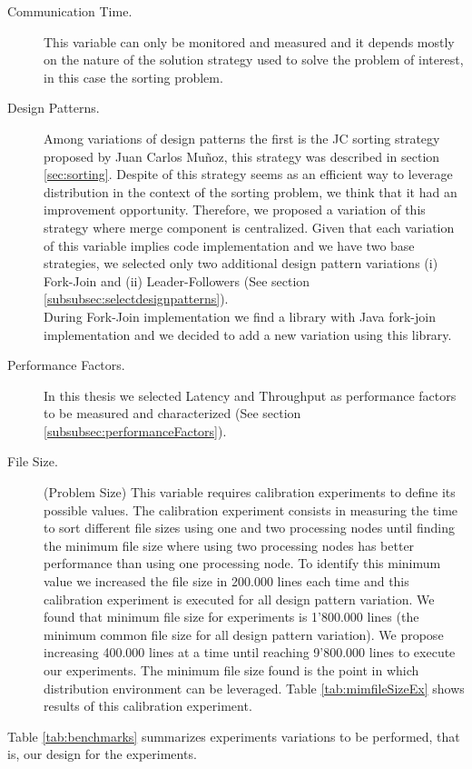 \begin{description}
	\item [Communication Time.] This variable can only be monitored and measured and it depends mostly on the nature of the solution strategy used to solve the problem of interest, in this case the sorting problem.
	\item [Design Patterns.] Among variations of design patterns the first is the JC sorting strategy proposed by Juan Carlos Mu\~{n}oz, this strategy was described in section \ref{sec:sorting}. Despite of this strategy seems as an efficient way to leverage distribution in the context of the sorting problem, we think that it had an improvement opportunity. Therefore, we proposed a variation of this strategy where merge component is centralized. Given that each variation of this variable implies code implementation and we have two base strategies, we selected only two additional design pattern variations (i) Fork-Join and (ii) Leader-Followers (See section \ref{subsubsec:selectdesignpatterns}). \\
	During Fork-Join implementation we find a library with Java fork-join implementation \cite{lea2000javae} and we decided to add a new variation using this library.
	\item [Performance Factors.] In this thesis we selected Latency and Throughput as performance factors to be measured and characterized (See section \ref{subsubsec:performanceFactors}).
	\item [File Size.] (Problem Size) This variable requires calibration experiments to define its possible values. The calibration experiment consists in measuring the time to sort  different file sizes using one and two  processing nodes until finding the minimum file size where using two processing nodes has better performance than using one processing node. To identify this minimum value we increased the file size in 200.000 lines each time and this calibration experiment is executed for all design pattern variation. We found that minimum file size for experiments is 1'800.000 lines (the minimum common file size for all design pattern variation). We propose increasing 400.000 lines at a time until reaching 9'800.000 lines to execute our experiments. The minimum file size found is the point in which distribution environment can be leveraged. Table \ref{tab:mimfileSizeEx} shows results of this calibration experiment.
\end{description}

Table \ref{tab:benchmarks} summarizes experiments variations to be performed, that is, our design for the experiments.

